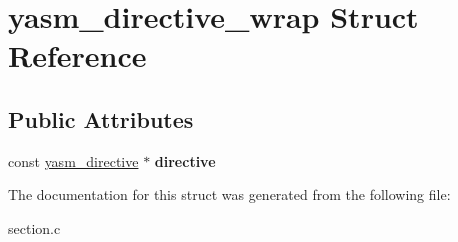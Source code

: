 \hypertarget{structyasm__directive__wrap}{\section{yasm\-\_\-directive\-\_\-wrap Struct Reference}
\label{structyasm__directive__wrap}
}
\subsection*{Public Attributes}
\begin{DoxyCompactItemize}
\item 
\hypertarget{structyasm__directive__wrap_af8658e7bd7df357110ce7a3cf466776d}{const \hyperlink{structyasm__directive}{yasm\-\_\-directive} $\ast$ {\bfseries directive}}\label{structyasm__directive__wrap_af8658e7bd7df357110ce7a3cf466776d}

\end{DoxyCompactItemize}


The documentation for this struct was generated from the following file\-:\begin{DoxyCompactItemize}
\item 
section.\-c\end{DoxyCompactItemize}
